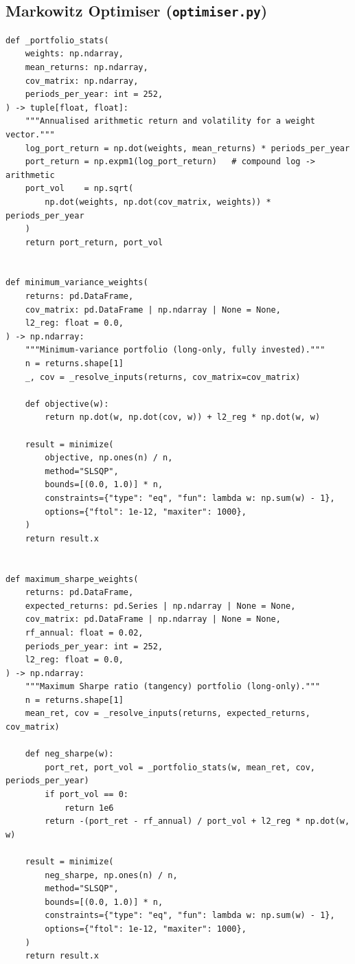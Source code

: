 \documentclass[a4paper]{report}
\begin{document}
\subsection{Markowitz Optimiser (\texttt{optimiser.py})}

\begin{Verbatim}[fontsize=\footnotesize, baselinestretch=0.85]
def _portfolio_stats(
    weights: np.ndarray,
    mean_returns: np.ndarray,
    cov_matrix: np.ndarray,
    periods_per_year: int = 252,
) -> tuple[float, float]:
    """Annualised arithmetic return and volatility for a weight vector."""
    log_port_return = np.dot(weights, mean_returns) * periods_per_year
    port_return = np.expm1(log_port_return)   # compound log -> arithmetic
    port_vol    = np.sqrt(
        np.dot(weights, np.dot(cov_matrix, weights)) * periods_per_year
    )
    return port_return, port_vol


def minimum_variance_weights(
    returns: pd.DataFrame,
    cov_matrix: pd.DataFrame | np.ndarray | None = None,
    l2_reg: float = 0.0,
) -> np.ndarray:
    """Minimum-variance portfolio (long-only, fully invested)."""
    n = returns.shape[1]
    _, cov = _resolve_inputs(returns, cov_matrix=cov_matrix)

    def objective(w):
        return np.dot(w, np.dot(cov, w)) + l2_reg * np.dot(w, w)

    result = minimize(
        objective, np.ones(n) / n,
        method="SLSQP",
        bounds=[(0.0, 1.0)] * n,
        constraints={"type": "eq", "fun": lambda w: np.sum(w) - 1},
        options={"ftol": 1e-12, "maxiter": 1000},
    )
    return result.x


def maximum_sharpe_weights(
    returns: pd.DataFrame,
    expected_returns: pd.Series | np.ndarray | None = None,
    cov_matrix: pd.DataFrame | np.ndarray | None = None,
    rf_annual: float = 0.02,
    periods_per_year: int = 252,
    l2_reg: float = 0.0,
) -> np.ndarray:
    """Maximum Sharpe ratio (tangency) portfolio (long-only)."""
    n = returns.shape[1]
    mean_ret, cov = _resolve_inputs(returns, expected_returns, cov_matrix)

    def neg_sharpe(w):
        port_ret, port_vol = _portfolio_stats(w, mean_ret, cov, periods_per_year)
        if port_vol == 0:
            return 1e6
        return -(port_ret - rf_annual) / port_vol + l2_reg * np.dot(w, w)

    result = minimize(
        neg_sharpe, np.ones(n) / n,
        method="SLSQP",
        bounds=[(0.0, 1.0)] * n,
        constraints={"type": "eq", "fun": lambda w: np.sum(w) - 1},
        options={"ftol": 1e-12, "maxiter": 1000},
    )
    return result.x
\end{Verbatim}
\end{document}
